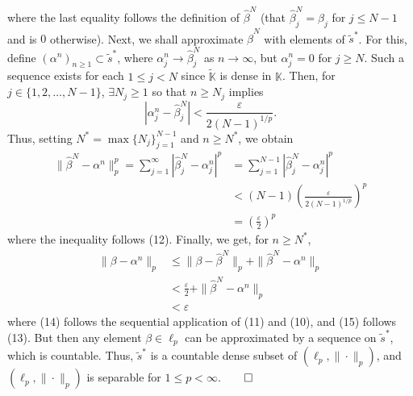 \documentclass[10pt]{article}
\newcommand{\mbb}[1]{\mathbb{#1}}
\newcommand{\1}[1]{\mathbbm{1}_{#1}}
\begin{document}
    where the last equality follows the definition of $\hat{\beta}^N$ (that $\hat{\beta}^N_j=\beta_j$ for $j\leq N-1$ and is $0$ otherwise). Next, we shall approximate $\hat{\beta}^N$ with elements of $\widetilde{s}^\ast$.
    For this, define $(\alpha^n)_{n\geq 1}\subset\widetilde{s}^\ast$, where $\alpha^n_j\rightarrow\hat{\beta}^N_j$ as $n\rightarrow\infty$, but $\alpha^n_j=0$ for $j\geq N$. Such a sequence exists for each
    $1\leq j<N$ since $\widetilde{\mbb{K}}$ is dense in $\mbb{K}$. Then, for $j\in\{1,2,\dots,N-1\}$, $\exists N_j\geq 1$ so that $n\geq N_j$ implies
    \[|\alpha^n_j-\hat{\beta}^N_j|<\frac{\varepsilon}{2(N-1)^{1/p}}.\tag{12}\]
    Thus, setting $N^\ast=\max\{N_j\}_{j=1}^{N-1}$ and $n\geq N^\ast$, we obtain
    \begin{align*}
        \|\hat{\beta}^N-\alpha^n\|_p^p=\sum_{j=1}^\infty|\hat{\beta}^N_j-\alpha^n_j|^p&=\sum_{j=1}^{N-1}|\hat{\beta}^N_j-\alpha^n_j|^p\\
        &<(N-1)\left(\frac{\varepsilon}{2(N-1)^{1/p}}\right)^p\\
        &=\left(\frac{\varepsilon}{2}\right)^p\tag{13}
    \end{align*}
    where the inequality follows (12). Finally, we get, for $n\geq N^\ast$,
    \begin{align*}
        \|\beta-\alpha^n\|_p&\leq\|\beta-\hat{\beta}^N\|_p+\|\hat{\beta}^N-\alpha^n\|_p\\
        &<\frac{\varepsilon}{2}+\|\hat{\beta}^N-\alpha^n\|_p\tag{14}\\
        &<\varepsilon\tag{15}
    \end{align*}
    where (14) follows the sequential application of (11) and (10), and (15) follows (13). But then any element $\beta\in\ell_p$ can be
    approximated by a sequence on $\widetilde{s}^\ast$, which is countable. Thus, $\widetilde{s}^\ast$ is a countable dense subset of $(\ell_p,\|\cdot\|_p)$, and $(\ell_p,\|\cdot\|_p)$ is
    separable for $1\leq p<\infty$.\hfill{$\qed$}
\end{document}
